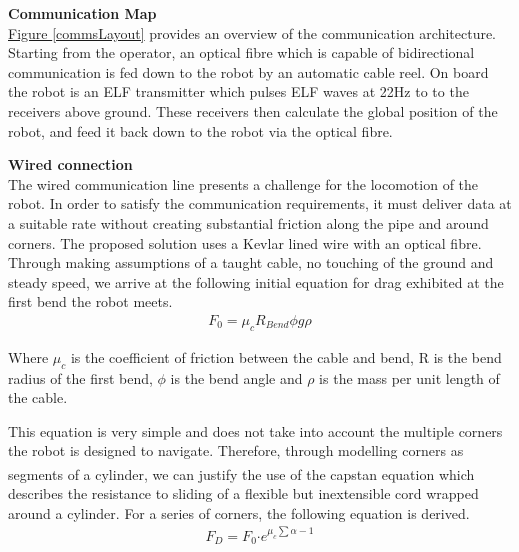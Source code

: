 \documentclass[11pt]{article}		%
\newcommand{\supercite}[1]{\textsuperscript{\cite{#1}}}		%
\newcommand{\figref}[1]{\hyperref[#1]{Figure \ref*{#1}}}    %
\begin{document}
	        \textbf{Communication Map}
	        \\
	        \figref{commsLayout} provides an overview of the communication architecture. 
	        Starting from the operator, an optical fibre which is capable of bidirectional communication is fed down to the robot by an automatic cable reel. 
	        On board the robot is an ELF transmitter which pulses ELF waves at 22Hz to to the receivers above ground. 
	        These receivers then calculate the global position of the robot, and feed it back down to the robot via the optical fibre.
	        \\
			
			\begin{floatingfigure}[r]{0pt} \end{floatingfigure}
			
            \textbf{Wired connection}
	        \\
	        The wired communication line presents a challenge for the locomotion of the robot. 
	        In order to satisfy the communication requirements, it must deliver data at a suitable rate without creating substantial friction along the pipe and around corners. 
	        The proposed solution uses a Kevlar lined wire with an optical fibre. 
	        Through making assumptions of a taught cable, no touching of the ground and steady speed, we arrive at the following initial equation for drag exhibited at the first bend the robot meets. 
	        \begin{align}
					F_0 = \mu_c R_{Bend} \phi   g \rho
			\end{align}
	        
	        Where $\mu_c$ is the coefficient of friction between the cable and bend, R is the bend radius of the first bend, $\phi$ is the bend angle and $\rho$ is the mass per unit length of the cable.
	        
	        This equation is very simple and does not take into account the multiple corners the robot is designed to navigate.
	        Therefore, through modelling corners as segments of a cylinder, we can justify the use of the capstan equation \supercite{capstan} which describes the resistance to sliding of a flexible but inextensible cord wrapped around a cylinder. 
	        For a series of corners, the following equation is derived.
	        \begin{align}
	                F_D = F_0 \boldsymbol{\cdot} {e}^{\mu_c \sum \alpha -1} \label{cableDrag}
	        \end{align}
	
\end{document}
